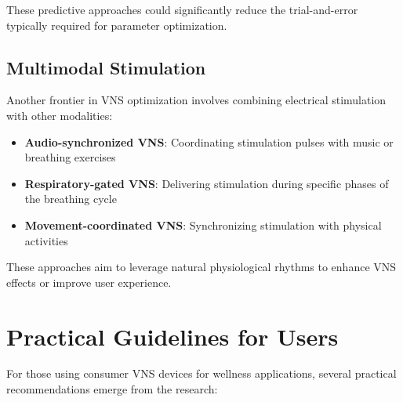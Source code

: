 \documentclass[
  Letterpaper,
]{scrbook}
\providecommand{\tightlist}{%
  \setlength{\itemsep}{0pt}\setlength{\parskip}{0pt}}\usepackage{longtable,booktabs,array}
\begin{document}
These predictive approaches could significantly reduce the
trial-and-error typically required for parameter optimization.

\subsection{Multimodal Stimulation}\label{multimodal-stimulation}

Another frontier in VNS optimization involves combining electrical
stimulation with other modalities:

\begin{itemize}
\tightlist
\item
  \textbf{Audio-synchronized VNS}: Coordinating stimulation pulses with
  music or breathing exercises
\item
  \textbf{Respiratory-gated VNS}: Delivering stimulation during specific
  phases of the breathing cycle
\item
  \textbf{Movement-coordinated VNS}: Synchronizing stimulation with
  physical activities
\end{itemize}

These approaches aim to leverage natural physiological rhythms to
enhance VNS effects or improve user experience.

\section{Practical Guidelines for
Users}\label{practical-guidelines-for-users}

For those using consumer VNS devices for wellness applications, several
practical recommendations emerge from the research:
\end{document}
